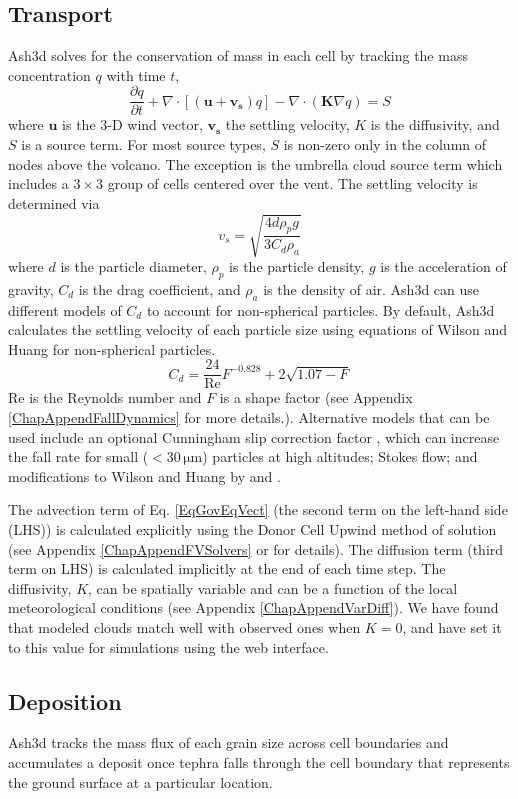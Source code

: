 \subsection{Transport}\label{ChapIntroSecTrans}
Ash3d solves for the conservation of mass in each cell by tracking the mass
concentration $q$ with time $t$,
\begin{equation}\label{EqGovEqVect}
 \frac{\partial q}{\partial t} +
   \nabla \cdot \left[ \left(\mathbf{u} + \mathbf{v_s} \right) q \right]
 - \nabla \cdot \left( \mathbf{K} \nabla q\right) = S
\end{equation}
where $\mathbf{u}$ is the 3-D wind vector,
$\mathbf{v_s}$ the settling velocity, $K$ is the
diffusivity, and $S$ is a source term. For most source types, $S$
is non-zero only in the column of nodes above the volcano. The
exception is the umbrella cloud source term which includes a
$3 \times 3$ group of cells centered over the vent.
The settling velocity is determined via \cite[p.182]{Bird1960}
\begin{equation}
v_s=\sqrt{\frac{4d\rho_p g}{3C_d\rho_a}}\label{EqFallVel}
\end{equation}
where $d$ is the particle diameter, $\rho_p$ is the particle density, $g$ is
the acceleration of gravity, $C_d$ is the drag coefficient, and $\rho_a$
is the density of air.
Ash3d can use different models of $C_d$ to account for non-spherical particles.
By default, Ash3d calculates the settling
velocity of each particle size using equations of Wilson and Huang \cite{Wilson1979}
for non-spherical particles.
\begin{equation}
C_d = \frac{24}{\mathrm{Re}}F^{-0.828}+2 \sqrt{1.07-F}\label{EqDragWH}
\end{equation}
$\mathrm{Re}$ is the Reynolds number and $F$ is a shape factor (see
Appendix \ref{ChapAppendFallDynamics} for more details.).
Alternative models that can be used include an
optional Cunningham slip correction factor \cite[p.407]{Seinfeld2006},
which can increase the fall rate for small ($<30 \,\mathrm{\mu m}$)
particles at high altitudes;
Stokes flow; and modifications to Wilson and Huang by \cite{Ganser1993} and
\cite{Pfeiffer2005}.

The advection term of Eq. \ref{EqGovEqVect} (the second term on the left-hand side
(LHS)) is calculated explicitly using the Donor Cell Upwind method of
solution (see Appendix \ref{ChapAppendFVSolvers} or \cite{Schwaiger2012} for details).
The diffusion term (third term on
LHS) is calculated implicitly at the end of each time step. The diffusivity,
$K$, can be spatially variable and can be a function of the local meteorological
conditions (see Appendix \ref{ChapAppendVarDiff}).
We have found that modeled clouds match well with observed ones
when $K=0$, and have set it to this value for simulations using the web interface.

\subsection{Deposition}\label{ChapIntroSecDepo}
Ash3d tracks the mass flux of each grain size across cell boundaries and
accumulates a deposit once tephra falls through the cell boundary that
represents the ground surface at a particular location.

